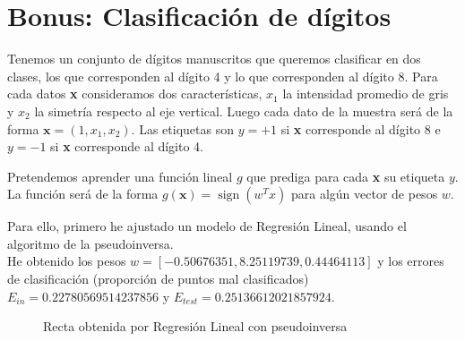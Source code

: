 \documentclass[a4]{article}
\begin{document}
\newpage
\section{Bonus: Clasificación de dígitos}

Tenemos un conjunto de dígitos manuscritos que queremos clasificar
en dos clases, los que corresponden al dígito 4 y lo que corresponden
al dígito 8. Para cada datos \textbf{x} consideramos dos características,
$x_1$ la intensidad promedio de gris y $x_2$ la simetría respecto
al eje vertical. Luego cada dato de la muestra será de la forma
$\textbf{x}=(1,x_1,x_2)$. Las etiquetas son $y=+1$ si \textbf{x}
corresponde al dígito 8 e $y=-1$ si \textbf{x} corresponde al dígito 4.

Pretendemos aprender una función lineal $g$ que prediga para cada \textbf{x}
su etiqueta $y$. La función será de la forma $g(\textbf{x})=\operatorname{sign}(w^Tx)$
para algún vector de pesos $w$.

Para ello, primero he ajustado un modelo de Regresión Lineal, usando el algoritmo
de la pseudoinversa. \\ He obtenido los pesos $w= [-0.50676351,  8.25119739,  0.44464113]$
 y los errores de clasificación (proporción de puntos mal clasificados) $E_{in}=0.22780569514237856$ y $E_{test} = 0.25136612021857924$.

\begin{figure}[H]
    \centering
    \caption{Recta obtenida por Regresión Lineal con pseudoinversa}
    \label{fig:lin-regress}
\end{figure}
\vspace{-3mm}
\end{document}
